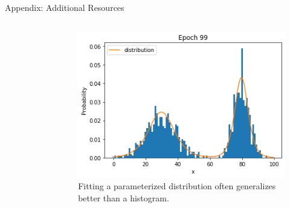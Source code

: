 \begin{frame}[allowframebreaks]{Appendix: Additional Resources}
\begin{columns}
\begin{column}{0.45\textwidth}
\begin{figure}
        \end{figure}
    \end{column}
    \begin{column}{0.55\textwidth}
       \begin{figure}
            \centering
            \includegraphics[width=\textwidth,keepaspectratio]{images/arm/histogram_parameterised.png}
            \caption{Fitting a parameterized distribution often generalizes better than a histogram.}
        \end{figure}
    \end{column}
\end{columns}
    
\end{frame}